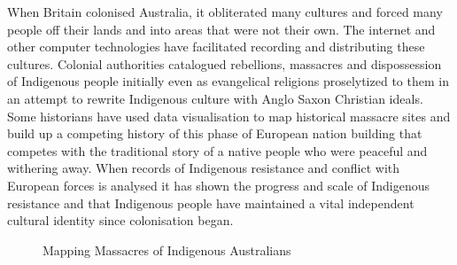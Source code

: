 When Britain colonised Australia, it obliterated many cultures and forced many people off their lands and into areas that were not their own. The internet and other computer technologies have facilitated recording and distributing these cultures. Colonial authorities catalogued rebellions, massacres and dispossession of Indigenous people initially even as evangelical religions proselytized to them in an attempt to rewrite Indigenous culture with Anglo Saxon Christian ideals. Some historians have used data visualisation to map historical massacre sites\cite{newyorker_massacres} and build up a competing history of this phase of European nation building that competes with the traditional story of a native people who were peaceful and withering away. When records of Indigenous resistance and conflict with European forces is analysed it has shown the progress and scale of Indigenous resistance and that Indigenous people have maintained a vital independent cultural identity since colonisation began.
\begin{figure}
     \hfill
\caption{Mapping Massacres of Indigenous Australians\cite{ABC_massacres}}
\end{figure}


